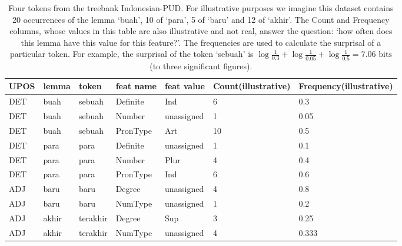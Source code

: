 \documentclass[USenglish]{article}
\makeatletter
\providecommand{\DIFaddtex}[1]{{\protect\color{blue}\uwave{#1}}} %
\providecommand{\DIFdeltex}[1]{{\protect\color{red}\sout{#1}}} %
\providecommand{\DIFdelbegin}{} %
\providecommand{\DIFaddFL}[1]{\DIFadd{#1}} %
\providecommand{\DIFdelFL}[1]{\DIFdel{#1}} %
\providecommand{\DIFaddbeginFL}{} %
\providecommand{\DIFaddendFL}{} %
\providecommand{\DIFdelbeginFL}{} %
\providecommand{\DIFdelendFL}{} %
\providecommand{\DIFadd}[1]{\texorpdfstring{\DIFaddtex{#1}}{#1}} %
\providecommand{\DIFdel}[1]{\texorpdfstring{\DIFdeltex{#1}}{}} %
\providecommand{\DIFscaledelfig}{0.5}
\newlength{\DIFdelgraphicswidth} %
\newlength{\DIFdelgraphicsheight} %
\providecommand{\DIFaddincludegraphics}[2][]{{\color{blue}\fbox{\DIFOincludegraphics[#1]{#2}}}} %
\providecommand{\DIFdelincludegraphics}[2][]{%
\sbox{\DIFdelgraphicsbox}{\DIFOincludegraphics[#1]{#2}}%
\settoboxwidth{\DIFdelgraphicswidth}{\DIFdelgraphicsbox} %
\settoboxtotalheight{\DIFdelgraphicsheight}{\DIFdelgraphicsbox} %
\scalebox{\DIFscaledelfig}{%
\parbox[b]{\DIFdelgraphicswidth}{\usebox{\DIFdelgraphicsbox}\\[-\baselineskip] \rule{\DIFdelgraphicswidth}{0em}}\llap{\resizebox{\DIFdelgraphicswidth}{\DIFdelgraphicsheight}{%
\setlength{\unitlength}{\DIFdelgraphicswidth}%
\begin{picture}(1,1)%
\thicklines\linethickness{2pt} %
{\color[rgb]{1,0,0}\put(0,0){\framebox(1,1){}}}%
{\color[rgb]{1,0,0}\put(0,0){\line( 1,1){1}}}%
{\color[rgb]{1,0,0}\put(0,1){\line(1,-1){1}}}%
\end{picture}%
}\hspace*{3pt}}} %
} %
\DeclareRobustCommand{\DIFdelbegin}{\DIFOdelbegin \let\includegraphics\DIFdelincludegraphics} %
\DeclareRobustCommand{\DIFaddbeginFL}{\DIFOaddbeginFL \let\includegraphics\DIFaddincludegraphics} %
\DeclareRobustCommand{\DIFaddendFL}{\DIFOaddendFL \let\includegraphics\DIFOincludegraphics} %
\DeclareRobustCommand{\DIFdelbeginFL}{\DIFOdelbeginFL \let\includegraphics\DIFdelincludegraphics} %
\DeclareRobustCommand{\DIFdelendFL}{\DIFOaddendFL \let\includegraphics\DIFOincludegraphics} %
\let\sout@orig\sout %
\renewcommand{\sout}[1]{\ifmmode\text{\sout@orig{\ensuremath{#1}}}\else\sout@orig{#1}\fi} %
\makeatother
\begin{document}
\begin{table}[ht]
    \centering
    \caption{Four tokens from the treebank Indonesian-PUD. For illustrative purposes we imagine this dataset contains 20 occurrences of the lemma `buah', 10 of `para', 5 of `baru' and 12 of `akhir'. The Count and Frequency columns, whose values in this table are also illustrative and not real, answer the question: `how often does this lemma have this value for this feature?'. The frequencies are used to calculate the surprisal of a particular token. For example, the surprisal of the token `sebuah' is $\log{\frac{1}{0.3}}+\log{\frac{1}{0.05}}+\log{\frac{1}{0.5}} = 7.06\text{ bits}$ (to three significant figures).} %
    \label{tab:unassigned_ex_SPLIT}   
    \begin{tabular}{p{0.7cm}p{1cm}p{1.4cm}p{1.3cm}p{1.5cm}p{1.4cm}p{1.6cm}}
\toprule

UPOS&lemma	&token	&feat \DIFdelbeginFL \DIFdelFL{name }\DIFdelendFL \DIFaddbeginFL \DIFaddFL{category }\DIFaddendFL & feat value & Count\newline (illustrative) & Frequency\newline (illustrative)	\\ \midrule

DET & buah & sebuah & Definite& Ind & 6 & 0.3\\
DET & buah & sebuah & Number& unassigned & 1 & 0.05\\
DET & buah & sebuah & PronType& Art & 10 & 0.5
\\\midrule
DET & para	& para	&Definite & unassigned & 1 & 0.1\\
DET & para	& para	&Number & Plur & 4 & 0.4\\
DET & para	& para	&PronType & Ind & 6 & 0.6
\\\midrule
ADJ&baru	&baru& Degree&unassigned & 4 & 0.8\\
ADJ&baru	&baru& NumType&unassigned & 1 & 0.2 \\\midrule
ADJ & akhir	&terakhir&	Degree& Sup & 3 & 0.25\\
ADJ & akhir	&terakhir&	NumType & unassigned & 4 & 0.333\\
\bottomrule
\end{tabular}
\end{table}


\FloatBarrier
\DIFdelbegin %
\end{document}
